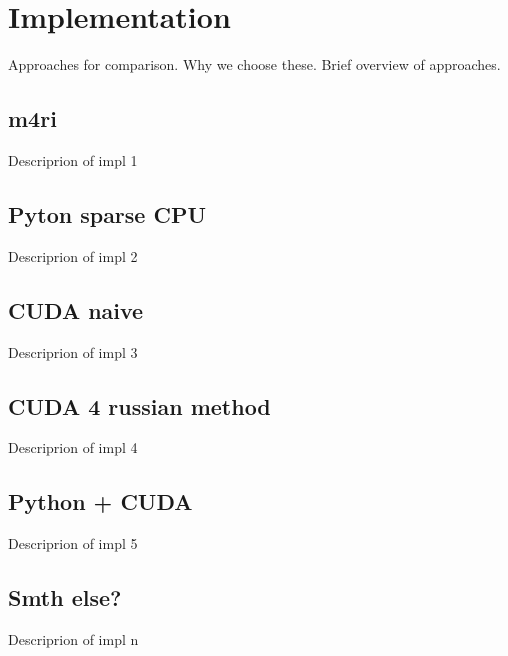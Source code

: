 \section{Implementation}

Approaches for comparison. Why we choose these.
Brief overview of approaches.

\subsection{m4ri}

Descriprion of impl 1

\subsection{Pyton sparse CPU}

Descriprion of impl 2

\subsection{CUDA naive}

Descriprion of impl 3

\subsection{CUDA 4 russian method}

Descriprion of impl 4

\subsection{Python + CUDA}

Descriprion of impl 5

\subsection{Smth else?}

Descriprion of impl n

